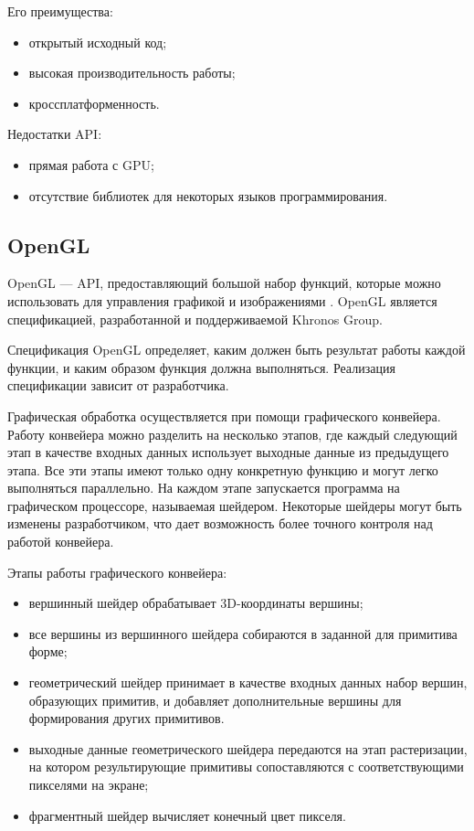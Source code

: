 Его преимущества:

\begin{itemize}
	\item открытый исходный код;
	\item высокая производительность работы;
	\item кроссплатформенность.
\end{itemize}

Недостатки API:

\begin{itemize}
	\item прямая работа с GPU;
	\item отсутствие библиотек для некоторых языков программирования.
\end{itemize}

\subsection{OpenGL}

OpenGL --- API, предоставляющий большой набор функций, которые можно использовать для управления графикой и изображениями \cite{directx}. OpenGL является спецификацией, разработанной и поддерживаемой Khronos Group.

Спецификация OpenGL определяет, каким должен быть результат работы каждой функции, и каким образом функция должна выполняться. Реализация спецификации зависит от разработчика.

Графическая обработка осуществляется при помощи графического конвейера. Работу конвейера можно разделить на несколько этапов, где каждый следующий этап в качестве входных данных использует выходные данные из предыдущего этапа. Все эти этапы имеют только одну конкретную функцию и могут легко выполняться параллельно. На каждом этапе запускается программа на графическом процессоре, называемая шейдером. Некоторые шейдеры могут быть изменены разработчиком, что дает возможность более точного контроля над работой конвейера.

Этапы работы графического конвейера:

\begin{itemize}
	\item вершинный шейдер обрабатывает 3D-координаты вершины;
	\item все вершины из вершинного шейдера собираются в заданной для примитива форме;
	\item геометрический шейдер принимает в качестве входных данных набор вершин, образующих примитив, и добавляет дополнительные вершины для формирования других примитивов.
	\item выходные данные геометрического шейдера передаются на этап растеризации, на котором результирующие примитивы сопоставляются с соответствующими пикселями на экране;
	\item фрагментный шейдер вычисляет конечный цвет пикселя.
\end{itemize}

